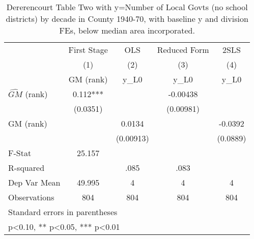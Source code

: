 \begin{table}[htbp]\centering
\def\sym#1{\ifmmode^{#1}\else\(^{#1}\)\fi}
\caption{Dererencourt Table Two with y=Number of Local Govts (no school districts) by decade in County 1940-70, with baseline y and division FEs, below median area incorporated.}
\begin{tabular}{l*{4}{c}}
\toprule
                    & First Stage   &         OLS   &Reduced Form   &        2SLS   \\
                    &\multicolumn{1}{c}{(1)}&\multicolumn{1}{c}{(2)}&\multicolumn{1}{c}{(3)}&\multicolumn{1}{c}{(4)}\\
                    &\multicolumn{1}{c}{GM  (rank)}&\multicolumn{1}{c}{y\_L0}&\multicolumn{1}{c}{y\_L0}&\multicolumn{1}{c}{y\_L0}\\
\midrule
$\hat{GM}$ (rank)   &       0.112***&               &    -0.00438   &               \\
                    &    (0.0351)   &               &   (0.00981)   &               \\
\addlinespace
GM  (rank)          &               &      0.0134   &               &     -0.0392   \\
                    &               &   (0.00913)   &               &    (0.0889)   \\
\midrule
F-Stat              &      25.157   &               &               &               \\
R-squared           &               &        .085   &        .083   &               \\
Dep Var Mean        &      49.995   &           4   &           4   &           4   \\
Observations        &         804   &         804   &         804   &         804   \\
\bottomrule
\multicolumn{5}{l}{\footnotesize Standard errors in parentheses}\\
\multicolumn{5}{l}{\footnotesize * p<0.10, ** p<0.05, *** p<0.01}\\
\end{tabular}
\end{table}
